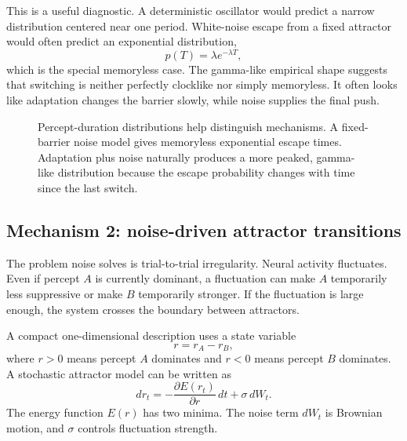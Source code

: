 This is a useful diagnostic. A deterministic oscillator would predict a narrow distribution centered near one period. White-noise escape from a fixed attractor would often predict an exponential distribution,
\[
p(T)=\lambda e^{-\lambda T},
\]
which is the special memoryless case. The gamma-like empirical shape suggests that switching is neither perfectly clocklike nor simply memoryless. It often looks like adaptation changes the barrier slowly, while noise supplies the final push.

\begin{figure}[!htbp]
\centering
{}
\caption{Percept-duration distributions help distinguish mechanisms. A fixed-barrier noise model gives memoryless exponential escape times. Adaptation plus noise naturally produces a more peaked, gamma-like distribution because the escape probability changes with time since the last switch.}
\end{figure}

\subsection{Mechanism 2: noise-driven attractor transitions}

The problem noise solves is trial-to-trial irregularity. Neural activity fluctuates. Even if percept \(A\) is currently dominant, a fluctuation can make \(A\) temporarily less suppressive or make \(B\) temporarily stronger. If the fluctuation is large enough, the system crosses the boundary between attractors.

A compact one-dimensional description uses a state variable
\[
r = r_A-r_B,
\]
where \(r>0\) means percept \(A\) dominates and \(r<0\) means percept \(B\) dominates. A stochastic attractor model can be written as
\[
dr_t
=
-\frac{\partial E(r_t)}{\partial r}\,dt
+\sigma\,dW_t .
\]
The energy function \(E(r)\) has two minima. The noise term \(dW_t\) is Brownian motion, and \(\sigma\) controls fluctuation strength.

